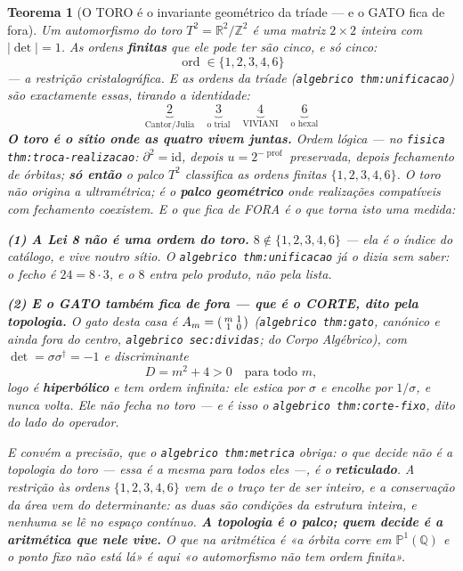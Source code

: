 \documentclass[11pt,a4paper]{article}
\newcommand{\abs}[1]{\lvert #1\rvert}
\newcommand{\dg}{^{\dagger}}
\newtheorem{teorema}{Teorema}
\newcommand{\code}[1]{\texttt{#1}}
\begin{document}
\begin{teorema}[O TORO é o invariante geométrico da tríade --- e o GATO fica de
fora]\label{thm:toro}
Um automorfismo do toro $T^{2}=\mathbb{R}^{2}/\mathbb{Z}^{2}$ é uma matriz $2\times2$
\emph{inteira} com $\abs{\det}=1$. As ordens \textbf{finitas} que ele pode ter são cinco,
e só cinco:
\[
\boxed{\;\operatorname{ord}\in\{1,2,3,4,6\}\;}
\]
--- a restrição cristalográfica. E as ordens da tríade (\code{algebrico thm:unificacao}) são
\emph{exactamente} essas, tirando a identidade:
\[
\underbrace{2}_{\text{Cantor/Julia}}\quad
\underbrace{3}_{\text{o trial}}\quad
\underbrace{4}_{\text{VIVIANI}}\quad
\underbrace{6}_{\text{o hexal}}
\]
\textbf{O toro é o sítio onde as quatro vivem juntas.} \emph{Ordem lógica} ---
no \code{fisica thm:troca-realizacao}: $\partial^{2}=\mathrm{id}$, depois
$u=2^{-\operatorname{prof}}$ preservada, depois fechamento de órbitas; \textbf{só
então} o palco $T^{2}$ classifica as ordens finitas $\{1,2,3,4,6\}$. O toro não
\emph{origina} a ultramétrica; é o \textbf{palco geométrico} onde realizações
compatíveis com fechamento coexistem. E o que fica de FORA é o que torna
isto uma medida:

\textbf{(1) A Lei 8 não é uma ordem do toro.} $8\notin\{1,2,3,4,6\}$ --- ela é o
\emph{índice} do catálogo, e vive noutro sítio. O \code{algebrico thm:unificacao} já o dizia
sem saber: o fecho é $24=8\cdot3$, e o $8$ entra pelo produto, não pela lista.

\textbf{(2) E o GATO também fica de fora --- que é o CORTE, dito pela topologia.} O gato
desta casa é $A_m=\begin{psmallmatrix}m&1\\1&0\end{psmallmatrix}$ (\code{algebrico thm:gato}, canónico e ainda fora do centro, \code{algebrico sec:dividas}; do
\emph{Corpo Algébrico}), com $\det=\sigma\sigma\dg=-1$ e discriminante
\[
D=m^{2}+4>0\quad\text{para todo }m,
\]
logo é \textbf{hiperbólico} e tem ordem \emph{infinita}: ele estica por $\sigma$ e
encolhe por $1/\sigma$, e nunca volta. \emph{Ele não fecha no toro} --- e é isso o
\code{algebrico thm:corte-fixo}, dito do lado do operador.

\emph{E convém a precisão, que o \code{algebrico thm:metrica} obriga}: o que decide não é a
topologia do toro --- essa é a mesma para todos eles ---, é o \textbf{reticulado}. A
restrição às ordens $\{1,2,3,4,6\}$ vem de o traço ter de ser \emph{inteiro}, e a
conservação da área vem do \emph{determinante}: as duas são condições da estrutura
inteira, e nenhuma se lê no espaço contínuo. \textbf{A topologia é o palco; quem decide é
a aritmética que nele vive.} O que na aritmética é «a órbita corre
em $\mathbb{P}^1(\mathbb{Q})$ e o ponto fixo não está lá» é aqui «o automorfismo não tem
ordem finita».


\end{teorema}
\end{document}
